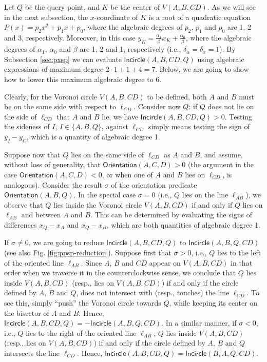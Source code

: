 \documentclass[letterpaper,11pt]{article}
\newcommand{\incircle}{\textsf{Incircle}\xspace}
\newcommand{\vor}{Voronoi\xspace}
\begin{document}
Let $Q$ be the query point, and $K$ be the center of $V(A,B,CD)$. As
we will see in the next subsection, the $x$-coordinate of $K$ is a
root of a quadratic equation $P(x)=p_2x^2+p_1x+p_0$, where the
algebraic degrees of $p_2$, $p_1$ and $p_0$ are 1, 2 and 3,
respectively. Moreover, in this case
$y_K=\frac{\alpha_1}{\beta}x_K+\frac{\alpha_0}{\beta}$, where the
algebraic degrees of $\alpha_1$, $\alpha_0$ and $\beta$ are 1, 2 and
1, respectively (i.e., $\delta_\alpha=\delta_x=1$). By Subsection
\ref{sec:pxsp} we can evaluate $\incircle(A,B,CD,Q)$
using algebraic expressions of maximum degree
$2\cdot{}1+1+4=7$. Below, we are going to show
how to lower this maximum algebraic degree to 6.

Clearly, for the \vor circle $V(A,B,CD)$ to be defined, both $A$ and
$B$ must be on the same side with respect to $\ell_{CD}$. Consider now
$Q$: if $Q$ does not lie on the side of $\ell_{CD}$ that $A$ and $B$
lie, we have $\incircle(A,B,CD,Q)>0$. Testing the sideness of $I$,
$I\in\{A,B,Q\}$, against $\ell_{CD}$ simply means testing the sign of
$y_I-y_C$, which is a quantity of algebraic degree 1.


Suppose now that $Q$ lies on the same side of $\ell_{CD}$
as $A$ and $B$, and assume, without loss of generality, that
$\textsf{Orientation}(A,C,D)>0$ (the argument in the case
$\textsf{Orientation}(A,C,D)<0$, or when one of $A$ and $B$ lies on
$\ell_{CD}$, is analogous).
Consider the result $\sigma$ of the orientation
predicate $\textsf{Orientation}(A,B,Q)$. In the special case $\sigma=0$
(i.e., $Q$ lies on the line $\ell_{AB}$), we observe that $Q$ lies
inside the \vor circle $V(A,B,CD)$ if and only if $Q$ lies on
$\ell_{AB}$ and between $A$ and $B$. This can be determined by
evaluating the signs of differences $x_Q-x_A$ and $x_Q-x_B$, which are
both quantities of algebraic degree 1.

If $\sigma\ne{}0$, we are going to reduce $\incircle(A,B,CD,Q)$ to
$\incircle(A,B,Q,CD)$ (see also Fig. \ref{fig:ppsp-reduction}).
Suppose first that $\sigma>0$, i.e., $Q$ lies to the left of the oriented
line $\ell_{AB}$. Since $A$, $B$ and $CD$ appear on $V(A,B,CD)$ in
that order when we traverse it in the counterclockwise sense, we
conclude that $Q$ lies inside $V(A,B,CD)$ (resp., lies on $V(A,B,CD)$)
if and only if the circle defined by $A$, $B$ and $Q$,
does not intersect with (resp., touches) the line $\ell_{CD}$. To see
this, simply ``push'' the \vor circle towards $Q$, while keeping its
center on the bisector of $A$ and $B$. Hence,
$\incircle(A,B,CD,Q)=-\incircle(A,B,Q,CD)$.
In a similar manner, if $\sigma<0$, i.e., $Q$ lies to the right of the
oriented line $\ell_{AB}$, $Q$ lies inside $V(A,B,CD)$ (resp., lies on
$V(A,B,CD)$) if and only if the circle defined by $A$, $B$ and $Q$
intersects the line $\ell_{CD}$. Hence,
$\incircle(A,B,CD,Q)=\incircle(B,A,Q,CD)$.
\end{document}
